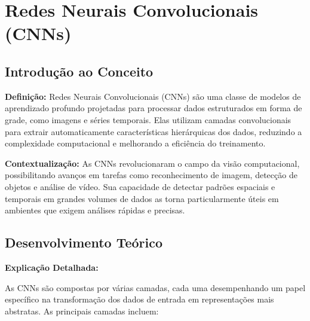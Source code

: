 \section{Redes Neurais Convolucionais (CNNs)}
\subsection{Introdução ao Conceito}
\textbf{}  
\setcounter{figure}{0}

\textbf{Definição:}  
Redes Neurais Convolucionais (CNNs) são uma classe de modelos de aprendizado profundo projetadas para processar dados estruturados em forma de grade, como imagens e séries temporais. Elas utilizam camadas convolucionais para extrair automaticamente características hierárquicas dos dados, reduzindo a complexidade computacional e melhorando a eficiência do treinamento.

\textbf{Contextualização:}  
As CNNs revolucionaram o campo da visão computacional, possibilitando avanços em tarefas como reconhecimento de imagem, detecção de objetos e análise de vídeo. Sua capacidade de detectar padrões espaciais e temporais em grandes volumes de dados as torna particularmente úteis em ambientes que exigem análises rápidas e precisas.

\subsection{Desenvolvimento Teórico}
\textbf{}  

\textbf{Explicação Detalhada:}

As CNNs são compostas por várias camadas, cada uma desempenhando um papel específico na transformação dos dados de entrada em representações mais abstratas. As principais camadas incluem:

